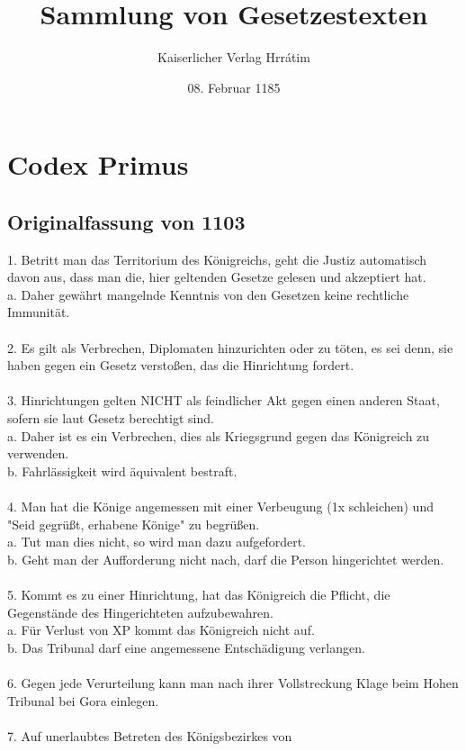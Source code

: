 \documentclass{article}
\title{Sammlung von Gesetzestexten}
\author{Kaiserlicher Verlag Hrrátim}
\date{08. Februar 1185}
\begin{document}
\maketitle
\newpage
\section{Codex Primus}
\subsection{Originalfassung von 1103}
1. Betritt man das Territorium des Königreichs, geht die Justiz automatisch davon aus, dass man die, hier geltenden Gesetze gelesen und akzeptiert hat.\\
a. Daher gewährt mangelnde Kenntnis von den Gesetzen keine rechtliche Immunität.
\\\\
2. Es gilt als Verbrechen, Diplomaten hinzurichten oder zu töten, es sei denn, sie haben gegen ein Gesetz verstoßen, das die Hinrichtung fordert.
\\\\
3. Hinrichtungen gelten NICHT als feindlicher Akt gegen einen anderen Staat,
sofern sie laut Gesetz berechtigt sind.\\
a. Daher ist es ein Verbrechen, dies als Kriegsgrund gegen das Königreich zu verwenden.\\
b. Fahrlässigkeit wird äquivalent bestraft.
\\\\
4. Man hat die Könige angemessen mit einer Verbeugung (1x schleichen) und "Seid gegrüßt, erhabene Könige" zu begrüßen.\\
a. Tut man dies nicht, so wird man dazu aufgefordert.\\
b. Geht man der Aufforderung nicht nach, darf die Person
hingerichtet werden.
\\\\
5. Kommt es zu einer Hinrichtung, hat das Königreich die Pflicht, die Gegenstände des Hingerichteten aufzubewahren.\\
a. Für Verlust von XP kommt das Königreich nicht auf.\\
b. Das Tribunal darf
eine angemessene Entschädigung verlangen.
\\\\
6. Gegen jede Verurteilung kann man nach ihrer Vollstreckung Klage beim Hohen Tribunal bei Gora einlegen.
\\\\
7. Auf unerlaubtes Betreten des Königsbezirkes von
\end{document}
